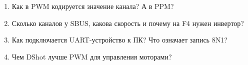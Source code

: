 \begin{exam}
\begin{enumerate}
\item Как в PWM кодируется значение канала? А в PPM?
\item Сколько каналов у SBUS, какова скорость и почему на F4 нужен инвертор?
\item Как подключается UART-устройство к ПК? Что означает запись 8N1?
\item Чем DShot лучше PWM для управления моторами?
\end{enumerate}
\end{exam}

